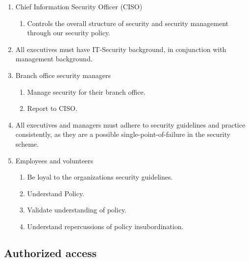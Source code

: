 \begin{enumerate}
  \item Chief Information Security Officer (CISO)
  \begin{enumerate}
    \item Controls the overall structure of security and security management through our security policy.
  \end{enumerate}
  \item All executives must have IT-Security background, in conjunction with management background.
  \item Branch office security managers
  \begin{enumerate}
     \item Manage security for their branch office.
     \item Report to CISO.
  \end{enumerate}
  \item All executives and managers must adhere to security guidelines and practice consistently, as they are a possible single-point-of-failure in the security scheme.
  \item Employees and volunteers
  \begin{enumerate}
    \item Be loyal to the organizations security guidelines.
    \item Understand Policy.
    \item Validate understanding of policy.
    \item Understand repercussions of policy insubordination.
  \end{enumerate}
\end{enumerate}

\subsection{Authorized access}

